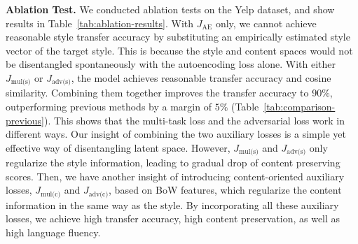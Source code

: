 \documentclass[11pt,a4paper]{article}
\newcommand{\loss}[1]{J_{\text{#1}}}
\begin{document}

\textbf{Ablation Test.} We conducted ablation tests on the Yelp dataset, and show results in Table~\ref{tab:ablation-results}. With $\loss{AE}$ only, we cannot achieve reasonable style transfer accuracy by substituting an empirically estimated style vector of the target style.  This is because the style and content spaces would not be disentangled spontaneously with the autoencoding loss alone.
With either $\loss{mul(s)}$ or $\loss{adv(s)}$, the model achieves reasonable transfer accuracy and cosine similarity. Combining them together improves the transfer accuracy to 90\%, outperforming previous methods by a margin of $5\%$ (Table~\ref{tab:comparison-previous}). This shows that the multi-task loss and the adversarial loss work in different ways. Our insight of combining the two auxiliary losses is a simple yet effective way of disentangling latent space.
However, $\loss{mul(s)}$ and $\loss{adv(s)}$ only regularize the style information, leading to gradual drop of content preserving scores. Then, we have another insight of introducing content-oriented auxiliary losses, $\loss{mul(c)}$ and $\loss{adv(c)}$, based on BoW features, which regularize the content information in the same way as the style. By incorporating all these auxiliary losses, we achieve high transfer accuracy, high content preservation, as well as high language fluency.

\end{document}
